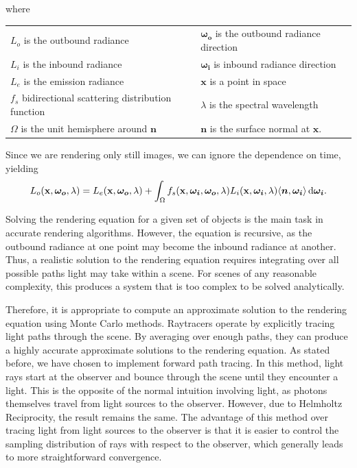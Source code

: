 \documentclass[12pt]{article}
\DeclarePairedDelimiter\ip{\langle }{\rangle}
\begin{document}
where
\begin{center}
  \begin{tabu}{ll}
    \(L_{o}\) is the outbound radiance & \(\bm{\omega_o}\) is the outbound radiance direction\\
    \(L_{i}\) is the inbound radiance & \(\bm{\omega_i}\) is inbound radiance direction\\
    \(L_{e}\) is the emission radiance & \(\mathbf x\) is a point in space\\
    \(f_s\) bidirectional scattering distribution function & \(\lambda\) is the spectral wavelength\\
    \(\Omega\) is the unit hemisphere around \(\bm n\) & \(\bm n\) is the surface normal at \(\mathbf x\).
  \end{tabu}
\end{center}
Since we are rendering only still images, we can ignore the dependence on time, yielding
\[L_{o}(\mathbf x, \bm {\omega_{o}}, \lambda) = L_{e}(\mathbf x, \bm{\omega_o}, \lambda) + \int_\Omega f_s(\mathbf x, \bm{\omega_i}, \bm{\omega_o}, \lambda)L_i(\mathbf x, \bm{\omega_i}, \lambda)\ip{\bm n, \bm{\omega_i}} \dif \bm{\omega_i}.\]

Solving the rendering equation for a given set of objects is the main task in accurate rendering algorithms.
However, the equation is recursive, as the outbound radiance at one point may become the inbound radiance at another.
Thus, a realistic solution to the rendering equation requires integrating over all possible paths light may take within a scene.
For scenes of any reasonable complexity, this produces a system that is too complex to be solved analytically.

Therefore, it is appropriate to compute an approximate solution to the rendering equation using Monte Carlo methods.
Raytracers operate by explicitly tracing light paths through the scene.
By averaging over enough paths, they can produce a highly accurate approximate solutions to the rendering equation.
As stated before, we have chosen to implement forward path tracing.
In this method, light rays start at the observer and bounce through the scene until they encounter a light.
This is the opposite of the normal intuition involving light, as photons themselves travel from light sources to the observer.
However, due to Helmholtz Reciprocity, the result remains the same.
The advantage of this method over tracing light from light sources to the observer is that it is easier to control the sampling distribution of rays with respect to the observer, which generally leads to more straightforward convergence.
\end{document}
